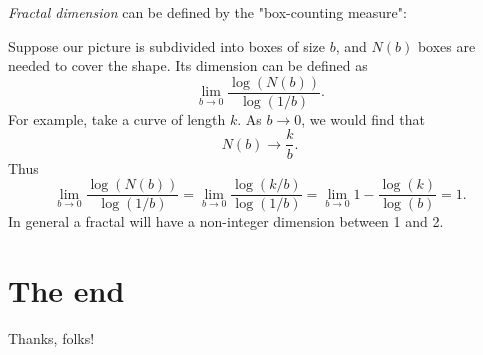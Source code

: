 \documentclass[bigger]{beamer}
\begin{document}
\emph{Fractal dimension} can be defined by the "box-counting measure":

Suppose our picture is subdivided into boxes of size \(b\), and \(N(b)\) boxes 
are needed to cover the shape.  Its dimension can be defined as
\[
\lim_{b\to 0}\frac{\log(N(b))}{\log(1/b)}.
\]
For example, take a curve of length \(k\). As \(b\to 0\), we would find that
\[
N(b)\to \frac{k}{b}.
\]
Thus
\[
\lim_{b\to 0}\frac{\log(N(b))}{\log(1/b)}=\lim_{b\to 0}\frac{\log(k/b)}{\log(1/b)}
=\lim_{b\to 0}1-\frac{\log(k)}{\log(b)}=1.
\]
In general a fractal will have a non-integer dimension between 1 and 2.


\section*{The end}
\label{sec:orgd7afff7}

Thanks, folks!
\end{document}
